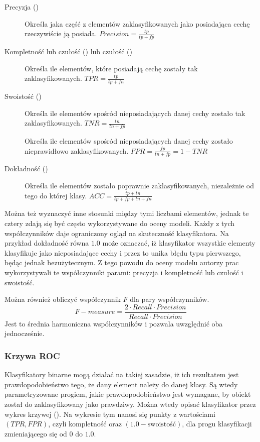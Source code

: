 \begin{description}
    \item[Precyzja ()] Określa jaka część z elementów zaklasyfikowanych jako posiadająca cechę rzeczywiście ją posiada. $\mathit{Precision} = \frac{tp}{tp + fp}$ 
    \item[Kompletność lub czułość () lub czułość ()] 
        Określa ile elementów, które posiadają cechę zostały tak zaklasyfikowanych. $\mathit{TPR} = \frac{tp}{tp + fn}$
    \item[Swoistość ()] Określa ile elementów spośród
        nieposiadających danej cechy zostało tak zaklasyfikowanych. $\mathit{TNR} = \frac{tn}{tn + fp}$
    \item[] Określa ile elementów spośród
        nieposiadających danej cechy zostało nieprawidłowo zaklasyfikowanych. $\mathit{FPR} = \frac{fp}{tn + fp} = 1 - \mathit{TNR}$
    \item[Dokładność ()] Określa ile elementów zostało poprawnie zaklasyfikowanych,
        niezależnie od tego do której klasy. $\mathit{ACC} = \frac{tp + tn}{tp + fp + tn + fn}$
\end{description}

Można też wyznaczyć inne stosunki między tymi liczbami elementów,
jednak te cztery zdają się być często wykorzystywane do oceny modeli.
Każdy z tych współczynników daje ograniczony ogląd na skuteczność
klasyfikatora. Na przykład dokładność równa $1.0$ może oznaczać,
iż klasyfikator wszystkie elementy klasyfikuje jako nieposiadające
cechy i przez to unika błędu typu pierwszego, będąc jednak bezużytecznym.
Z tego powodu do oceny modelu autorzy prac wykorzystywali te
współczynniki parami: precyzja i kompletność lub czułość i swoistość.

Można również obliczyć współczynnik $F$ dla pary współczynników. 
$$\mathit{F{-}measure} = \frac{2 \cdot Recall \cdot Precision}{Recall \cdot Precision}$$
Jest to średnia harmoniczna współczynników i pozwala uwzględnić oba jednocześnie.

\subsubsection{Krzywa ROC}

Klasyfikatory binarne mogą działać na takiej zasadzie, iż ich rezultatem jest prawdopodobieństwo
tego, że dany element należy do danej klasy. Są wtedy parametryzowane progiem,
jakie prawdopodobieństwo jest wymagane, by obiekt został do zaklasyfikowany jako prawdziwy. 
Można wtedy opisać klasyfikator przez wykres krzywej  
(). Na wykresie tym nanosi się punkty z wartościami
$(\mathit{TPR}, \mathit{FPR})$, czyli kompletność oraz $(1.0 - \text{swoistość})$, dla progu klasyfikacji 
zmieniającego się od $0$ do $1.0$.

